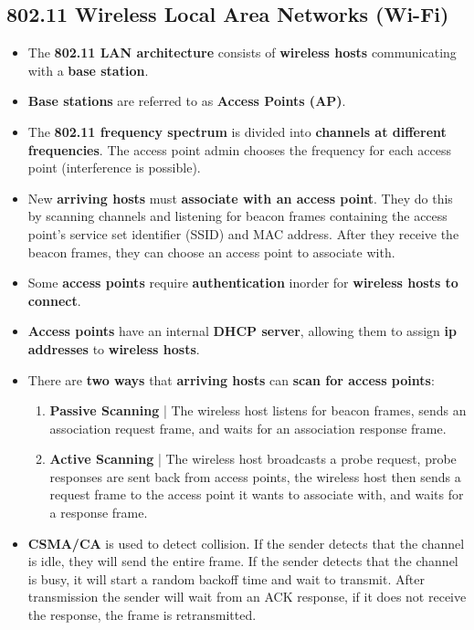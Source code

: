 \documentclass{article}
\begin{document}
    \subsection*{802.11 Wireless Local Area Networks (Wi-Fi)}
    \begin{itemize}
        \item The \textbf{802.11 LAN architecture} consists of \textbf{wireless hosts} communicating with a \textbf{base station}.
        \item \textbf{Base stations} are referred to as \textbf{Access Points (AP)}.
        \item The \textbf{802.11 frequency spectrum} is divided into \textbf{channels at different frequencies}. The access point admin chooses the frequency for each access point (interference is possible).
        \item New \textbf{arriving hosts} must \textbf{associate with an access point}. They do this by scanning channels and listening for beacon frames containing the access point's service set identifier (SSID) and MAC address. After they receive the beacon frames, they can choose an access point to associate with.
        \item Some \textbf{access points} require \textbf{authentication} inorder for \textbf{wireless hosts to connect}.
        \item \textbf{Access points} have an internal \textbf{DHCP server}, allowing them to assign \textbf{ip addresses} to \textbf{wireless hosts}.
        \item There are \textbf{two ways} that \textbf{arriving hosts} can \textbf{scan for access points}:
        \begin{enumerate}
            \item \textbf{Passive Scanning} | The wireless host listens for beacon frames, sends an association request frame, and waits for an association response frame.
            \item \textbf{Active Scanning} | The wireless host broadcasts a probe request, probe responses are sent back from access points, the wireless host then sends a request frame to the access point it wants to associate with, and waits for a response frame.
        \end{enumerate}
        \item \textbf{CSMA/CA} is used to detect collision. If the sender detects that the channel is idle, they will send the entire frame. If the sender detects that the channel is busy, it will start a random backoff time and wait to transmit. After transmission the sender will wait from an ACK response, if it does not receive the response, the frame is retransmitted.

\end{itemize}
\end{document}
